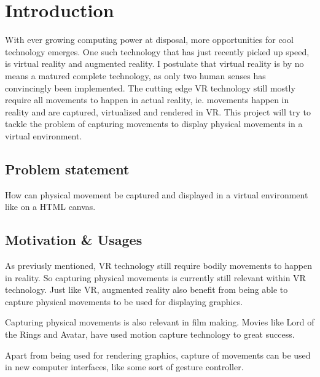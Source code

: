 \section{Introduction}
With ever growing computing power at disposal, more opportunities for cool technology emerges. One such technology that has just recently picked up speed, 
is virtual reality and augmented reality. I postulate that virtual reality is by no means a matured complete technology, as only two human senses has convincingly been implemented.
The cutting edge VR technology still mostly require all movements to happen in actual reality, ie. movements happen in reality and are captured, virtualized and rendered in VR.
This project will try to tackle the problem of capturing movements to display physical movements in a virtual environment.

\subsection{Problem statement}
How can physical movement be captured and displayed in a virtual environment like on a HTML canvas.

\subsection{Motivation \& Usages}
As previusly mentioned, VR technology still require bodily movements to happen in reality.
So capturing physical movements is currently still relevant within VR technology.
Just like VR, augmented reality also benefit from being able to capture physical movements to be used for displaying graphics.

Capturing physical movements is also relevant in film making.
Movies like Lord of the Rings and Avatar, have used motion capture technology to great success. 

Apart from being used for rendering graphics,
capture of movements can be used in new computer interfaces, 
like some sort of gesture controller.  